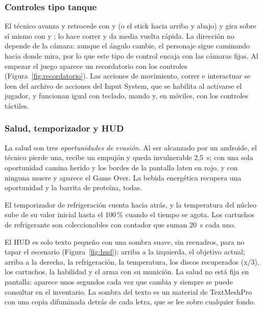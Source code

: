 

\subsubsection{Controles tipo tanque}

El técnico avanza y retrocede con  y  (o el stick hacia arriba y abajo) y gira
sobre sí mismo con  y ;  lo hace correr y  da media
vuelta rápida. La dirección no depende de la cámara: aunque el ángulo cambie, el personaje sigue
caminando hacia donde mira, por lo que este tipo de control encaja con las cámaras fijas. Al
empezar el juego aparece un recordatorio con los controles (Figura~\ref{fig:recordatorio}). Las
acciones de movimiento, correr e interactuar se leen del archivo de acciones del Input System,
que se habilita al activarse el jugador, y funcionan igual con teclado, mando y, en móviles, con los
controles táctiles.


\subsubsection{Salud, temporizador y HUD}

La salud son tres \textit{oportunidades de evasión}. Al ser alcanzado por un androide, el técnico
pierde una, recibe un empujón y queda invulnerable 2,5~s; con una sola oportunidad camina herido y
los bordes de la pantalla laten en rojo, y con ninguna muere y aparece el Game Over. La bebida
energética recupera una oportunidad y la barrita de proteína, todas.

El temporizador de refrigeración cuenta hacia atrás, y la temperatura del núcleo sube de su valor
inicial hasta el 100\,\% cuando el tiempo se agota. Los cartuchos de refrigerante son coleccionables
con contador que suman 20~s cada uno.

El HUD es solo texto pequeño con una sombra suave, sin recuadros, para no tapar el escenario
(Figura~\ref{fig:hud}): arriba a la izquierda, el objetivo actual; arriba a la derecha, la
refrigeración, la temperatura, los discos recuperados (x/3), los cartuchos, la habilidad y el arma
con su munición. La salud no está fija en pantalla: aparece unos segundos cada vez que cambia y
siempre se puede consultar en el inventario. La sombra del texto es un material de TextMeshPro con
una copia difuminada detrás de cada letra, que se lee sobre cualquier fondo.

